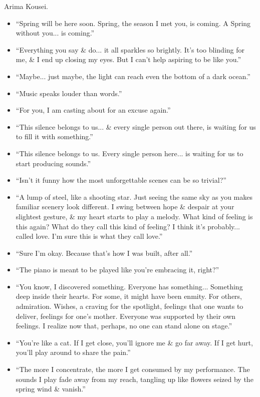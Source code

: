 \documentclass{article}
\begin{document}
\begin{enumerate}
    {\sc Arima Kousei.}
    \begin{itemize}
    	\item ``Spring will be here soon. Spring, the season I met you, is coming. A Spring without you... is coming.''
    	\item ``Everything you say \& do... it all sparkles so brightly. It's too blinding for me, \& I end up closing my eyes. But I can't help aspiring to be like you.''
    	\item ``Maybe... just maybe, the light can reach even the bottom of a dark ocean.''
    	\item ``Music speaks louder than words.''
    	\item ``For you, I am casting about for an excuse again.''
    	\item ``This silence belongs to us... \& every single person out there, is waiting for us to fill it with something.''
    	\item ``This silence belongs to us. Every single person here... is waiting for us to start producing sounds.''
    	\item ``Isn't it funny how the most unforgettable scenes can be so trivial?''
    	\item ``A lump of steel, like a shooting star. Just seeing the same sky as you makes familiar scenery look different. I swing between hope \& despair at your slightest gesture, \& my heart starts to play a melody. What kind of feeling is this again? What do they call this kind of feeling? I think it's probably... called love. I'm sure this is what they call love.''
    	\item ``Sure I'm okay. Because that's how I was built, after all.''
    	\item ``The piano is meant to be played like you're embracing it, right?''
    	\item ``You know, I discovered something. Everyone has something... Something deep inside their hearts. For some, it might have been enmity. For others, admiration. Wishes, a craving for the spotlight, feelings that one wants to deliver, feelings for one's mother. Everyone was supported by their own feelings. I realize now that, perhaps, no one can stand alone on stage.''
    	\item ``You're like a cat. If I get close, you'll ignore me \& go far away. If I get hurt, you'll play around to share the pain.''
    	\item ``The more I concentrate, the more I get consumed by my performance. The sounds I play fade away from my reach, tangling up like flowers seized by the spring wind \& vanish.''

\end{itemize}
\end{enumerate}
\end{document}
